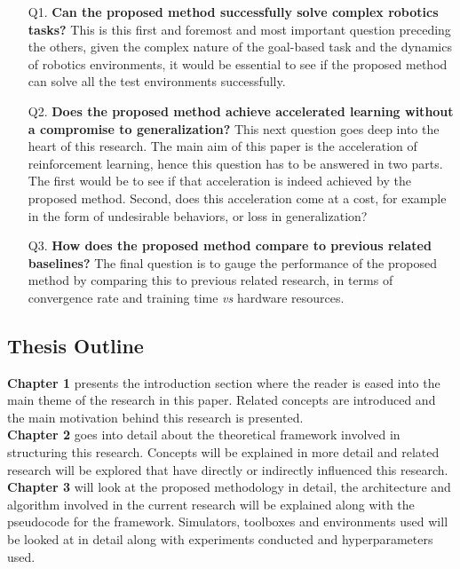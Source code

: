 \begin{itemize}[leftmargin=0.85in]
    \item[Q1.  ] \textbf{Can the proposed method successfully solve complex robotics tasks?} This is this first and foremost and most important question preceding the others, given the complex nature of the goal-based task and the dynamics of robotics environments, it would be essential to see if the proposed method can solve all the test environments successfully. \\

    \item[Q2.  ] \textbf{Does the proposed method achieve accelerated learning without a compromise to generalization?} This next question goes deep into the heart of this research. The main aim of this paper is the acceleration of reinforcement learning, hence this question has to be answered in two parts. The first would be to see if that acceleration is indeed achieved by the proposed method. Second, does this acceleration come at a cost, for example in the form of undesirable behaviors, or loss in generalization? \\

    \item[Q3.  ] \textbf{How does the proposed method compare to previous related baselines?} The final question is to gauge the performance of the proposed method by comparing this to previous related research, in terms of convergence rate and training time \textit{vs} hardware resources. \\
\end{itemize}

\subsection{Thesis Outline}

\textbf{Chapter 1} presents the introduction section where the reader is eased into the main theme of the research in this paper. Related concepts are introduced and the main motivation behind this research is presented. \\

\textbf{Chapter 2} goes into detail about the theoretical framework involved in structuring this research. Concepts will be explained in more detail and related research will be explored that have directly or indirectly influenced this research. \\

\textbf{Chapter 3} will look at the proposed methodology in detail, the architecture and algorithm involved in the current research will be explained along with the pseudocode for the framework. Simulators, toolboxes and environments used will be looked at in detail along with experiments conducted and hyperparameters used. \\

